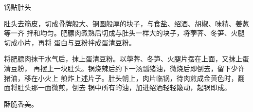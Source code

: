 \begin{recipe}{锅贴肚头}

\ingredients


\preparation

肚头去筋皮，切成骨牌般大、铜圆般厚的块子，与食盐、绍酒、胡椒、味精、姜葱等一齐
拌和均匀。肥膘肉煮熟后切成与肚头一样大的块子，将荸荠、冬笋、火腿切成小片，再将
蛋白与豆粉拌成蛋清豆粉。

将肥膘肉抹干水气后，抹上蛋清豆粉。以荸荠、冬笋、火腿片摆在上面，又抹上蛋清豆粉，
再摆上一块肚头。锅烧辣后约下一汤瓢猪油，微烧后即倒去，留下少许猪油，移在小火上
煎炸上述片子。肚头朝上，肉片临锅，待肉煎成金黄色时，翻面将肚头那一面微煎，倒去
锅中所有的油，加进绍酒轻轻簸动，起锅即成。

\features

酥脆香美。

\end{recipe}

